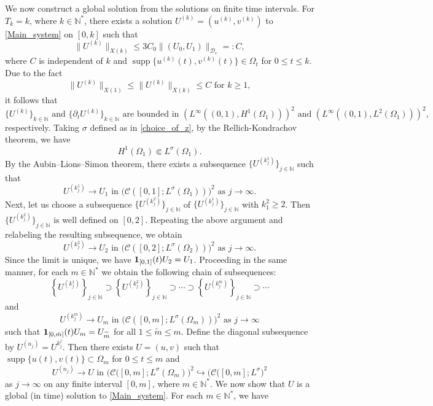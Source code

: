 \documentclass[11pt,reqno]{amsart}
\DeclareMathOperator{\supp}{supp}
\newcommand{\ity}{\infty}
\begin{document}
	 We now construct a global solution from the solutions on finite time intervals. For $T_k=k$, where $k\in\mathbb{N}^\ast$, there exists a solution $U^{(k)}=(u^{(k)},v^{(k)})$ to \eqref{Main_system} on $[0,k]$ such that
	\[
	\|U^{(k)}\|_{X(k)}\leq 3C_0\|(U_0,U_1)\|_{\mathcal D_r}=:C,
	\]
	where $C$ is independent of $k$ and $\supp\{u^{(k)}(t),v^{(k)}(t)\}\in \Omega_t$ for $0\leq t\leq k$. Due to the fact
	\[
	\|U^{(k)}\|_{X(1)}\leq \|U^{(k)}\|_{X(k)}\leq C\text{ for $k\geq 1$},
	\]
	it follows that
	$$\{U^{(k)}\}_{k\in \mathbb N} \text{ and }\{\partial_tU^{(k)}\}_{k\in \mathbb N} \text{ are bounded in }(L^{\infty}((0,1),H^1(\Omega_1)))^2 \text{ and }(L^{\infty}((0,1),L^2(\Omega_1)))^2, $$
	respectively. Taking $\sigma$ defined as in \eqref{choice_of_z}, by the Rellich-Kondrachov theorem, we have
	\[
	H^1(\Omega_1)\Subset L^{\sigma}(\Omega_1).
	\]
	By the Aubin--Lions--Simon theorem, there exists a subsequence $\{U^{(k^1_j)}\}_{j\in \mathbb N}$ such that
	\[
	U^{(k^1_{j})}\to U_1\text{ in }\bigl(\mathcal{C}([0,1];L^{\sigma}(\Omega_{1}))\bigr)^2 \text{ as } j\to\ity.
	\]
	Next, let us choose a subsequence $\{U^{(k^2_j)}\}_{j\in \mathbb N}$ of $\{U^{(k^1_j)}\}_{j\in \mathbb N}$ with $k^2_1\geq2$. Then $\{U^{(k^2_j)}\}_{j\in \mathbb N}$ is well defined on $[0,2]$. Repeating the above argument and relabeling the resulting subsequence, we obtain
	\[
	U^{(k^2_{j})}\to U_2\text{ in }\bigl(\mathcal{C}([0,2];L^{\sigma}(\Omega_{2}))\bigr)^2\text{ as } j\to\ity.
	\]
	Since the limit is unique, we have ${\bf 1}_{[0,1]}(t)U_2=U_1$. Proceeding in the same manner, for each $m\in\mathbb{N}^\ast$ we obtain the following chain of subsequences:
	\[
	\left\{U^{(k^1_{j})}\right\}_{j\in \mathbb N}\supset \left\{U^{(k^2_{j})}\right\}_{j\in \mathbb N} \supset\cdots\supset \left\{U^{(k^m_{j})}\right\}_{j\in \mathbb N}\supset \cdots
	\]
	and 
	\[
	U^{(k^m_{j})}\to U_{m} \text{ in }\bigl(\mathcal{C}([0,m];L^{\sigma}(\Omega_{m}))\bigr)^2\text{ as }j\to\ity
	\]
	such that ${\bf1}_{[0,\tilde{m}]}(t)U_m=U_{\widetilde{m}}$ for all $1\leq\widetilde{m}\leq m$. Define the diagonal subsequence by $U^{(n_j)}=U^{k^j_j}$. Then there exists $U=(u,v)$ such that $\supp\{u(t),v(t)\}\subset \Omega_{m}$ for $0\leq t\leq m$ and
	\begin{equation}\label{converge_C_Lq}
		U^{(n_j)}\to U\text{ in }\bigl(\mathcal{C}([0,m];L^{\sigma}(\Omega_m)\bigr)^2\hookrightarrow \bigl(\mathcal{C}([0,m];L^{\sigma}\bigr)^2
	\end{equation}
	as $j\to\ity$ on any finite interval $[0,m]$, where $m\in\mathbb{N}^\ast$. We now show that $U$ is a global (in time) solution to \eqref{Main_system}. For each $m\in\mathbb N^\ast$, we have 
\end{document}
